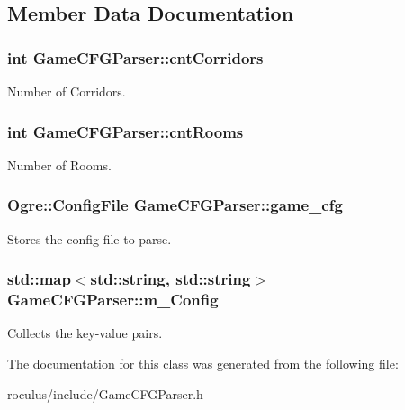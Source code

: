\subsection{\-Member \-Data \-Documentation}
\hypertarget{classGameCFGParser_a42c185380b0fb82948ef24fcdbcf1f0f}{
\subsubsection[{cnt\-Corridors}]{\setlength{\rightskip}{0pt plus 5cm}int {\bf \-Game\-C\-F\-G\-Parser\-::cnt\-Corridors}}}\label{classGameCFGParser_a42c185380b0fb82948ef24fcdbcf1f0f}
\-Number of \-Corridors. \hypertarget{classGameCFGParser_a026f91734a398714a8e8fae1fa3a4f7f}{
\subsubsection[{cnt\-Rooms}]{\setlength{\rightskip}{0pt plus 5cm}int {\bf \-Game\-C\-F\-G\-Parser\-::cnt\-Rooms}}}\label{classGameCFGParser_a026f91734a398714a8e8fae1fa3a4f7f}
\-Number of \-Rooms. \hypertarget{classGameCFGParser_a959aad3003435f1deef6f92ca7902316}{
\subsubsection[{game\-\_\-cfg}]{\setlength{\rightskip}{0pt plus 5cm}\-Ogre\-::\-Config\-File {\bf \-Game\-C\-F\-G\-Parser\-::game\-\_\-cfg}}}\label{classGameCFGParser_a959aad3003435f1deef6f92ca7902316}
\-Stores the config file to parse. \hypertarget{classGameCFGParser_a4c61cec38365caa5ed4650eff682ecd9}{
\subsubsection[{m\-\_\-\-Config}]{\setlength{\rightskip}{0pt plus 5cm}std\-::map$<$std\-::string, std\-::string$>$ {\bf \-Game\-C\-F\-G\-Parser\-::m\-\_\-\-Config}}}\label{classGameCFGParser_a4c61cec38365caa5ed4650eff682ecd9}
\-Collects the key-\/value pairs. 

\-The documentation for this class was generated from the following file\-:\begin{DoxyCompactItemize}
\item 
roculus/include/\-Game\-C\-F\-G\-Parser.\-h\end{DoxyCompactItemize}
